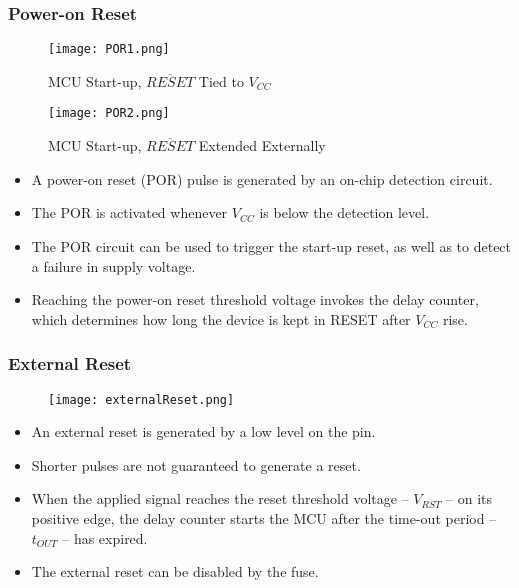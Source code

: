 \subsubsection{Power-on Reset}
\begin{figure}[H]
    \begin{minipage}{0.45\textwidth}
        \begin{center}
            \texttt{[image: POR1.png]}
            \caption*{MCU Start-up, $\overline{RESET}$ Tied to $V_{CC}$}
        \end{center}
    \end{minipage}
    \begin{minipage}{0.5\textwidth}
        \begin{center}
            \texttt{[image: POR2.png]}
            \caption*{MCU Start-up, $\overline{RESET}$ Extended Externally}
        \end{center}
    \end{minipage}
\end{figure}
\begin{itemize}
    \item A power-on reset (POR) pulse is generated by an on-chip detection circuit.
    \item The POR is activated whenever $V_{CC}$ is below the detection level.
    \item The POR circuit can be used to trigger the start-up reset, as well as to detect a failure in supply voltage.
    \item Reaching the power-on reset threshold voltage invokes the delay counter, which determines how long the device is kept in RESET after $V_{CC}$ rise.
\end{itemize}


\subsubsection{External Reset}
\begin{figure}[H]
    \begin{center}
        \texttt{[image: externalReset.png]}
    \end{center}
\end{figure}
\begin{itemize}
    \item An external reset is generated by a low level on the   pin.
    \item Shorter pulses are not guaranteed to generate a reset.
    \item When the applied signal reaches the reset threshold voltage – $V_{RST}$ – on its positive edge, the delay counter starts the MCU after the time-out period – $t_{OUT}$ – has expired.
    \item The external reset can be disabled by the  fuse.
\end{itemize}

